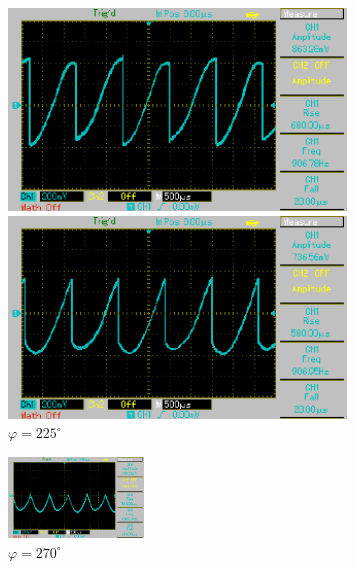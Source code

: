 \begin{figure}[h]
    \begin{minipage}{0.4\textwidth}
     \centering
      \includegraphics[width=0.8\textwidth]{Auswertung/3.pdf}
      \caption{$\varphi = 180^\circ$}
	\label{fig:tres}
    \end{minipage}\hfill
    \begin{minipage}{0.4\textwidth}
     \centering
      \includegraphics[width=0.8\textwidth]{Auswertung/4.pdf}
      \caption{$\varphi = 225^\circ$}
	\label{fig:qua}
    \end{minipage}
\end{figure}

\begin{figure}[h]
    \centering
    \includegraphics[width=0.32\textwidth]{Auswertung/5.pdf}
    \caption{$\varphi = 270^\circ$}
	\label{fig:sinco}
\end{figure}

